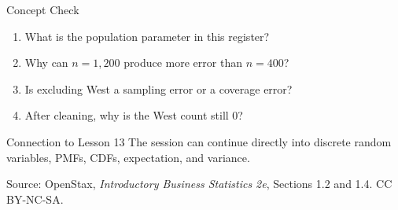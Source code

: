 \documentclass[aspectratio=169,10pt,english]{beamer}
\begin{document}
\begin{frame}{Concept Check}
  \begin{enumerate}
    \item What is the population parameter in this register?
    \item Why can $n=1{,}200$ produce more error than $n=400$?
    \item Is excluding West a sampling error or a coverage error?
    \item After cleaning, why is the West count still $0$?
  \end{enumerate}

  \vspace{0.6em}
  \begin{block}{Connection to Lesson 13}
    The session can continue directly into discrete random variables, PMFs,
    CDFs, expectation, and variance.
  \end{block}

  \vfill
  \scriptsize Source: OpenStax, \textit{Introductory Business Statistics 2e},
  Sections 1.2 and 1.4. CC BY-NC-SA.
\end{frame}

\appendix
\end{document}
